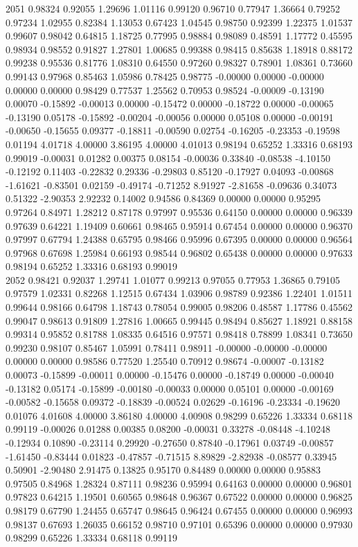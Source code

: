 {2051 0.98324 0.92055 1.29696 1.01116 0.99120 0.96710 0.77947 1.36664 0.79252 0.97234 1.02955 0.82384 1.13053 0.67423 1.04545 0.98750 0.92399 1.22375 1.01537 0.99607 0.98042 0.64815 1.18725 0.77995 0.98884 0.98089 0.48591 1.17772 0.45595 0.98934 0.98552 0.91827 1.27801 1.00685 0.99388 0.98415 0.85638 1.18918 0.88172 0.99238 0.95536 0.81776 1.08310 0.64550 0.97260 0.98327 0.78901 1.08361 0.73660 0.99143 0.97968 0.85463 1.05986 0.78425 0.98775 -0.00000 0.00000 -0.00000 0.00000 0.00000 0.98429 0.77537 1.25562 0.70953 0.98524 -0.00009 -0.13190 0.00070 -0.15892 -0.00013 0.00000 -0.15472 0.00000 -0.18722 0.00000 -0.00065 -0.13190 0.05178 -0.15892 -0.00204 -0.00056 0.00000 0.05108 0.00000 -0.00191 -0.00650 -0.15655 0.09377 -0.18811 -0.00590 0.02754 -0.16205 -0.23353 -0.19598 0.01194 4.01718 4.00000 3.86195 4.00000 4.01013 0.98194 0.65252 1.33316 0.68193 0.99019 -0.00031 0.01282 0.00375 0.08154 -0.00036 0.33840 -0.08538 -4.10150 -0.12192 0.11403 -0.22832 0.29336 -0.29803 0.85120 -0.17927 0.04093 -0.00868 -1.61621 -0.83501 0.02159 -0.49174 -0.71252 8.91927 -2.81658 -0.09636 0.34073 0.51322 -2.90353 2.92232 0.14002 0.94586 0.84369 0.00000 0.00000 0.95295 0.97264 0.84971 1.28212 0.87178 0.97997 0.95536 0.64150 0.00000 0.00000 0.96339 0.97639 0.64221 1.19409 0.60661 0.98465 0.95914 0.67454 0.00000 0.00000 0.96370 0.97997 0.67794 1.24388 0.65795 0.98466 0.95996 0.67395 0.00000 0.00000 0.96564 0.97968 0.67698 1.25984 0.66193 0.98544 0.96802 0.65438 0.00000 0.00000 0.97633 0.98194 0.65252 1.33316 0.68193 0.99019 \\
2052 0.98421 0.92037 1.29741 1.01077 0.99213 0.97055 0.77953 1.36865 0.79105 0.97579 1.02331 0.82268 1.12515 0.67434 1.03906 0.98789 0.92386 1.22401 1.01511 0.99644 0.98166 0.64798 1.18743 0.78054 0.99005 0.98206 0.48587 1.17786 0.45562 0.99047 0.98613 0.91809 1.27816 1.00665 0.99445 0.98494 0.85627 1.18921 0.88158 0.99314 0.95852 0.81788 1.08335 0.64516 0.97571 0.98418 0.78899 1.08341 0.73650 0.99230 0.98107 0.85467 1.05991 0.78411 0.98911 -0.00000 -0.00000 -0.00000 0.00000 0.00000 0.98586 0.77520 1.25540 0.70912 0.98674 -0.00007 -0.13182 0.00073 -0.15899 -0.00011 0.00000 -0.15476 0.00000 -0.18749 0.00000 -0.00040 -0.13182 0.05174 -0.15899 -0.00180 -0.00033 0.00000 0.05101 0.00000 -0.00169 -0.00582 -0.15658 0.09372 -0.18839 -0.00524 0.02629 -0.16196 -0.23334 -0.19620 0.01076 4.01608 4.00000 3.86180 4.00000 4.00908 0.98299 0.65226 1.33334 0.68118 0.99119 -0.00026 0.01288 0.00385 0.08200 -0.00031 0.33278 -0.08448 -4.10248 -0.12934 0.10890 -0.23114 0.29920 -0.27650 0.87840 -0.17961 0.03749 -0.00857 -1.61450 -0.83444 0.01823 -0.47857 -0.71515 8.89829 -2.82938 -0.08577 0.33945 0.50901 -2.90480 2.91475 0.13825 0.95170 0.84489 0.00000 0.00000 0.95883 0.97505 0.84968 1.28324 0.87111 0.98236 0.95994 0.64163 0.00000 0.00000 0.96801 0.97823 0.64215 1.19501 0.60565 0.98648 0.96367 0.67522 0.00000 0.00000 0.96825 0.98179 0.67790 1.24455 0.65747 0.98645 0.96424 0.67455 0.00000 0.00000 0.96993 0.98137 0.67693 1.26035 0.66152 0.98710 0.97101 0.65396 0.00000 0.00000 0.97930 0.98299 0.65226 1.33334 0.68118 0.99119 \\
}
